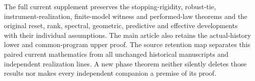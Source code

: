 The full current supplement preserves the stopping-rigidity, robust-tie, instrument-realization, finite-model witness and performed-law theorems and the original reset, rank, spectral, geometric, predictive and effective developments with their individual assumptions. The main article also retains the actual-history lower and common-program upper proof. The source retention map separates this paired current mathematics from all unchanged historical manuscripts and independent realization lines. A new phase theorem neither silently deletes those results nor makes every independent companion a premise of its proof.
